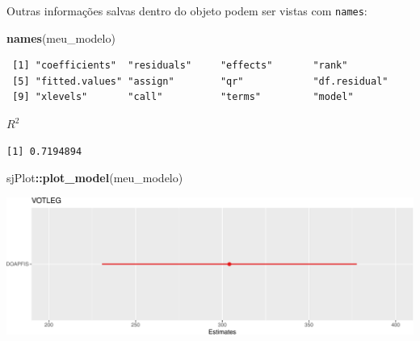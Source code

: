 \documentclass[
  9pt,
  ignorenonframetext,
  aspectratio=169]{beamer}
\newenvironment{Shaded}{\begin{snugshade}}{\end{snugshade}}
\newcommand{\KeywordTok}[1]{\textcolor[rgb]{0.13,0.29,0.53}{\textbf{#1}}}
\newcommand{\NormalTok}[1]{#1}
\newcommand{\OperatorTok}[1]{\textcolor[rgb]{0.81,0.36,0.00}{\textbf{#1}}}
\begin{document}
\begin{frame}[fragile]{Outras informações salvas dentro do objeto podem
ser vistas com \texttt{names}:}
\protect\hypertarget{outras-informauxe7uxf5es-salvas-dentro-do-objeto-podem-ser-vistas-com-names}{}
\begin{Shaded}
\begin{Highlighting}[]
\KeywordTok{names}\NormalTok{(meu\_modelo)}
\end{Highlighting}
\end{Shaded}

\begin{verbatim}
 [1] "coefficients"  "residuals"     "effects"       "rank"         
 [5] "fitted.values" "assign"        "qr"            "df.residual"  
 [9] "xlevels"       "call"          "terms"         "model"        
\end{verbatim}

\(R^2\)

\begin{Shaded}
\end{Shaded}

\begin{verbatim}
[1] 0.7194894
\end{verbatim}
\end{frame}

\begin{frame}[fragile]{}
\protect\hypertarget{section-3}{}
\begin{Shaded}
\begin{Highlighting}[]
\NormalTok{sjPlot}\OperatorTok{::}\KeywordTok{plot\_model}\NormalTok{(meu\_modelo)}
\end{Highlighting}
\end{Shaded}

\includegraphics{aula_12_files/figure-beamer/unnamed-chunk-16-1.pdf}
\end{frame}
\end{document}
